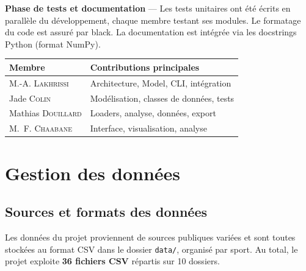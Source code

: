 \documentclass[12pt,a4paper]{article}
\newcommand{\fichier}[1]{\texttt{#1}}
\begin{document}
\textbf{Phase de tests et documentation} --- Les tests unitaires ont été écrits en
parallèle du développement, chaque membre testant ses modules. Le formatage du code
est assuré par black. La documentation est intégrée via les docstrings Python (format NumPy).

\begin{center}
\begin{tabular}{ll}
  \toprule
  \textbf{Membre} & \textbf{Contributions principales} \\
  \midrule
  M.-A. \textsc{Lakhrissi}  & Architecture, Model, CLI, intégration \\
  Jade \textsc{Colin}       & Modélisation, classes de données, tests \\
  Mathias \textsc{Douillard}& Loaders, analyse, données, export \\
  M.~F. \textsc{Chaabane}   & Interface, visualisation, analyse \\
  \bottomrule
\end{tabular}
\end{center}

\section{Gestion des données}
\label{sec:donnees}

\subsection{Sources et formats des données}

Les données du projet proviennent de sources publiques variées et sont toutes stockées
au format CSV dans le dossier \fichier{data/}, organisé par sport. Au total, le projet
exploite \textbf{36 fichiers CSV} répartis sur 10 dossiers.
\end{document}
